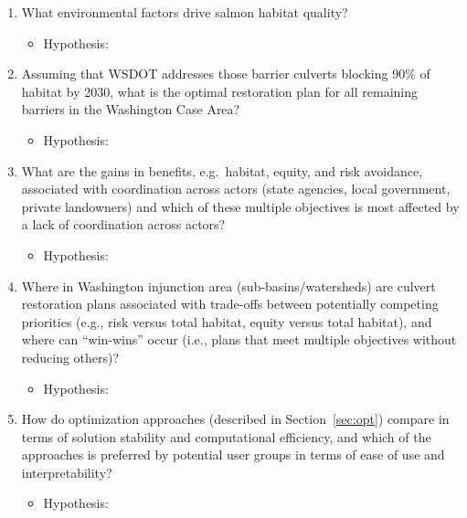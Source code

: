 \documentclass[12pt]{elsarticle}
\begin{document}
\begin{enumerate}
\item What environmental factors drive salmon habitat quality?
\begin{itemize}
\item Hypothesis:
\end{itemize}
\item Assuming that WSDOT addresses those barrier culverts blocking 90\% of habitat by 2030, what is the optimal restoration plan for all remaining barriers in the Washington Case Area?
\begin{itemize}
\item Hypothesis:
\end{itemize}
\item What are the gains in benefits, e.g.\ habitat, equity, and risk avoidance, associated with coordination across actors (state agencies, local government, private landowners) and which of these multiple objectives is most affected by a lack of coordination across actors? 
\begin{itemize}
\item Hypothesis:
\end{itemize}
\item Where in Washington injunction area (sub-basins/watersheds) are culvert restoration plans associated with trade-offs between potentially competing priorities (e.g., risk versus total habitat, equity versus total habitat), and where can ``win-wins'' occur (i.e., plans that meet multiple objectives without reducing others)? 
\begin{itemize}
\item Hypothesis:
\end{itemize}
\item How do optimization approaches (described in Section~\ref{sec:opt}) compare in terms of solution stability and computational efficiency, and which of the approaches is preferred by potential user groups in terms of ease of use and interpretability?
\begin{itemize}
\item Hypothesis:
\end{itemize}
\end{enumerate}
\end{document}
